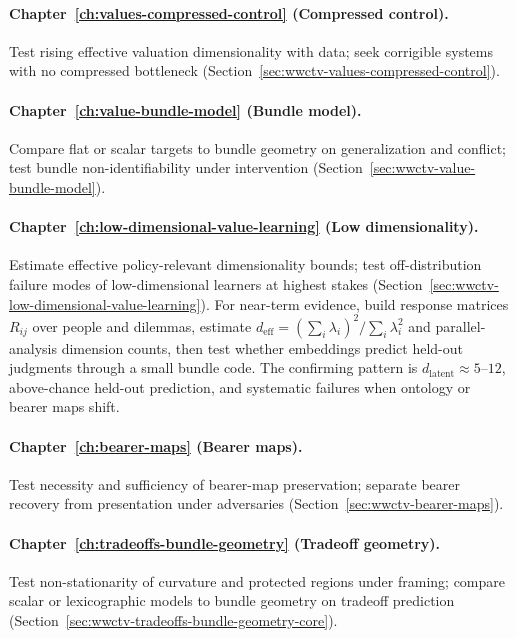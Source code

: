 \paragraph{Chapter~\ref{ch:values-compressed-control} (Compressed control).}
Test rising effective valuation dimensionality with data; seek corrigible systems with no compressed bottleneck (Section~\ref{sec:wwctv-values-compressed-control}).

\paragraph{Chapter~\ref{ch:value-bundle-model} (Bundle model).}
Compare flat or scalar targets to bundle geometry on generalization and conflict; test bundle non-identifiability under intervention (Section~\ref{sec:wwctv-value-bundle-model}).

\paragraph{Chapter~\ref{ch:low-dimensional-value-learning} (Low dimensionality).}
Estimate effective policy-relevant dimensionality bounds; test off-distribution failure modes of low-dimensional learners at highest stakes (Section~\ref{sec:wwctv-low-dimensional-value-learning}).
For near-term evidence, build response matrices \(R_{ij}\) over people and dilemmas, estimate \(d_{\mathrm{eff}}=(\sum_i\lambda_i)^2/\sum_i\lambda_i^2\) and parallel-analysis dimension counts, then test whether embeddings predict held-out judgments through a small bundle code.
The confirming pattern is \(d_{\mathrm{latent}}\approx 5\)--\(12\), above-chance held-out prediction, and systematic failures when ontology or bearer maps shift.

\paragraph{Chapter~\ref{ch:bearer-maps} (Bearer maps).}
Test necessity and sufficiency of bearer-map preservation; separate bearer recovery from presentation under adversaries (Section~\ref{sec:wwctv-bearer-maps}).

\paragraph{Chapter~\ref{ch:tradeoffs-bundle-geometry} (Tradeoff geometry).}
Test non-stationarity of curvature and protected regions under framing; compare scalar or lexicographic models to bundle geometry on tradeoff prediction (Section~\ref{sec:wwctv-tradeoffs-bundle-geometry-core}).


